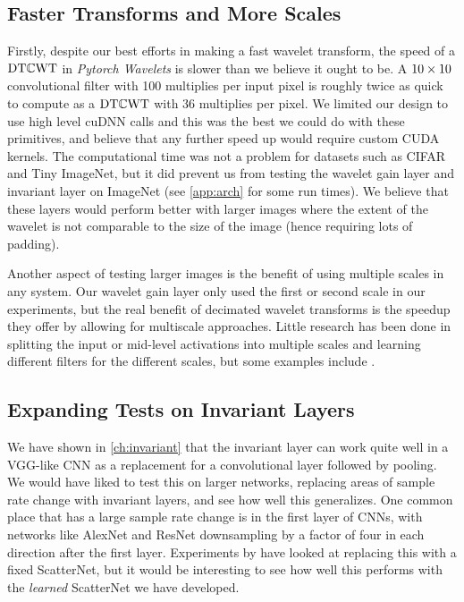 \subsection{Faster Transforms and More Scales}
Firstly, despite our best efforts in making a fast wavelet transform, the speed
of a $\mathrm{DT}\mathbb{C}\mathrm{WT}$ in \emph{Pytorch Wavelets} is slower than we believe it ought to be. A $10\times 10$
convolutional filter with 100 multiplies per input pixel is roughly twice as
quick to compute as a $\mathrm{DT}\mathbb{C}\mathrm{WT}$ with 36 multiplies per pixel. We limited our
design to use high level cuDNN calls and this was the best we could do with
these primitives, and believe that any further speed up would require custom CUDA
kernels. The computational time was not a problem for datasets such as CIFAR and Tiny
ImageNet, but it did prevent us from testing the wavelet gain layer and
invariant layer on ImageNet (see \autoref{app:arch} for some run times).
We believe that these layers would perform better with larger images where the
extent of the wavelet is not comparable to the size of the image (hence
requiring lots of padding).

Another aspect of testing larger images is the benefit of using multiple
scales in any system. Our wavelet gain layer only used the first or second scale
in our experiments, but the real benefit of decimated wavelet transforms is the
speedup they offer by allowing for multiscale approaches. Little research has
been done in splitting the input or mid-level activations into multiple scales
and learning different filters for the different scales, but some examples
include \cite{haber_learning_2017, fujieda_wavelet_2018}.

\subsection{Expanding Tests on Invariant Layers}
We have shown in \autoref{ch:invariant} that the invariant layer can work quite
well in a VGG-like CNN as a replacement for a convolutional layer followed by
pooling. We would have liked to test this on larger networks, replacing areas of
sample rate change with invariant layers, and see how well
this generalizes. One common place that has a large sample rate change is in the first layer of
CNNs, with networks like AlexNet and ResNet downsampling by a
factor of four in each direction after the first layer. Experiments by
\citeauthor{oyallon_scaling_2017} \cite{oyallon_scaling_2017} have looked at replacing this with a fixed
ScatterNet, but it would be interesting to see how well this performs with the
\emph{learned} ScatterNet we have developed.

